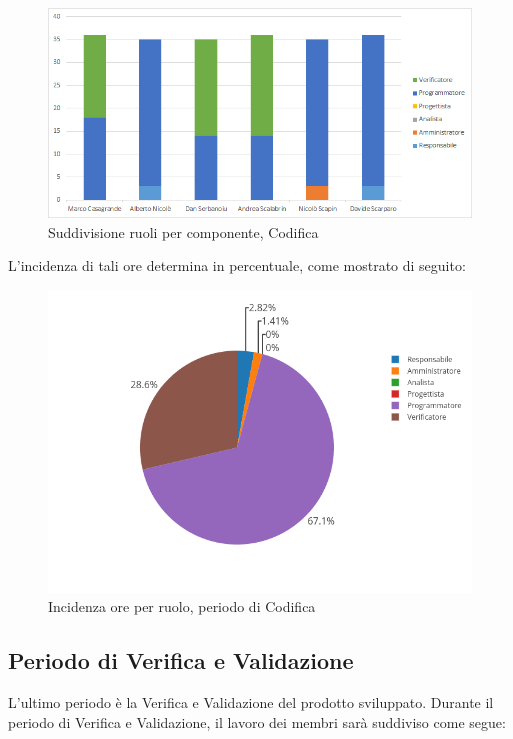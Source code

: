 \begin{figure}[H]
	\centering
	\includegraphics[scale=0.6]{img/6-4.png}
	\caption{Suddivisione ruoli per componente, Codifica}
\end{figure}

L'incidenza di tali ore determina in percentuale, come mostrato di seguito:
\begin{figure}[H]
	\centering
	\includegraphics[scale=0.6]{img/Codifica.png}
	\caption{Incidenza ore per ruolo, periodo di Codifica}
\end{figure}

\newpage
\subsection{Periodo di Verifica e Validazione}
L'ultimo periodo è la Verifica e Validazione del prodotto sviluppato. Durante il periodo di Verifica e Validazione, il lavoro dei membri sarà suddiviso come segue:

